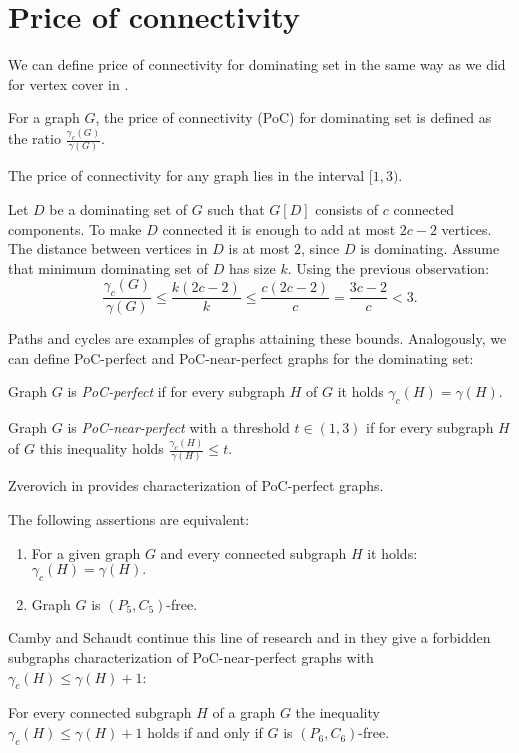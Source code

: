 \section{Price of connectivity}
We can define price of connectivity for dominating set in the same way as we did for vertex cover in .
\begin{defn}
	For a graph \(G\), the price of connectivity (PoC) for dominating set is defined as the ratio \(\frac{\gamma_c(G)}{\gamma(G)}\).
\end{defn}

\begin{obs}
	The price of connectivity for any graph lies in the interval \([1, 3)\).
\end{obs}

\begin{myproof}
	Let \(D\) be a dominating set of \(G\) such that \(G[D]\) consists of \(c\) connected components.
	To make \(D\) connected it is enough to add at most \(2c - 2\) vertices. The distance between vertices in \(D\) is at most \(2\),
	since \(D\) is dominating.
	Assume that minimum dominating set of \(D\) has size \(k\).
	Using the previous observation:
	\[\frac{\gamma_c(G)}{\gamma(G)} \leq {\frac{k(2c - 2)}{k}} \leq {\frac{c(2c-2)}{c}} = {\frac{3c - 2}{c}} < 3.\]
\end{myproof}
Paths and cycles are examples of graphs attaining these bounds. Analogously, we can define PoC-perfect and PoC-near-perfect graphs for the dominating set:

\begin{defn}
	Graph \(G\) is \emph{PoC-perfect} if for every subgraph \(H\) of \(G\) it holds \(\gamma_c(H) = \gamma(H)\).
\end{defn}

\begin{defn}
	Graph \(G\) is \emph{PoC-near-perfect} with a threshold \(t \in (1, 3)\) if for every subgraph \(H\) of \(G\) this inequality holds \(\frac{\gamma_c(H)}{\gamma(H)} \leq t\).
\end{defn}
Zverovich in \cite{Zverovich03} provides characterization of PoC-perfect graphs.
\begin{thm}\label{DSpoc:1}
The following assertions are equivalent:
\begin{enumerate}
	\item For a given graph \(G\) and every connected subgraph \(H\) it holds: \(\gamma_c(H) = \gamma(H).\)
	\item Graph \(G\) is \((P_5, C_5)\)-free.
\end{enumerate}
\end{thm}
Camby and Schaudt continue this line of research and in \cite{CambySchaudt14} they give a forbidden subgraphs characterization of PoC-near-perfect graphs 
with \(\gamma_c(H) \leq {\gamma(H) + 1}\):
\begin{thm}\label{DSpoc:2}
	For every connected subgraph \(H\) of a graph \(G\) the inequality \(\gamma_c(H) \leq {\gamma(H) + 1}\) holds if and only if
	\(G\) is \((P_6, C_6)\)-free.
\end{thm}

